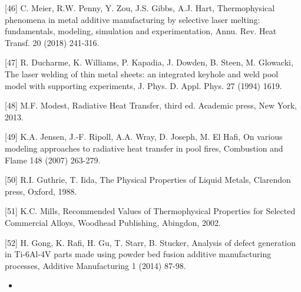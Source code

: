 \documentclass[10pt]{article}
\begin{document}
[46] C. Meier, R.W. Penny, Y. Zou, J.S. Gibbs, A.J. Hart, Thermophysical phenomena in metal additive manufacturing by selective laser melting: fundamentals, modeling, simulation and experimentation, Annu. Rev. Heat Transf. 20 (2018) 241-316.

[47] R. Ducharme, K. Williams, P. Kapadia, J. Dowden, B. Steen, M. Glowacki, The laser welding of thin metal sheets: an integrated keyhole and weld pool model with supporting experiments, J. Phys. D. Appl. Phys. 27 (1994) 1619.

[48] M.F. Modest, Radiative Heat Transfer, third ed. Academic press, New York, 2013.

[49] K.A. Jensen, J.-F. Ripoll, A.A. Wray, D. Joseph, M. El Hafi, On various modeling approaches to radiative heat transfer in pool fires, Combustion and Flame 148 (2007) 263-279.

[50] R.I. Guthrie, T. Iida, The Physical Properties of Liquid Metals, Clarendon press, Oxford, 1988.

[51] K.C. Mills, Recommended Values of Thermophysical Properties for Selected Commercial Alloys, Woodhead Publishing, Abingdon, 2002.

[52] H. Gong, K. Rafi, H. Gu, T. Starr, B. Stucker, Analysis of defect generation in Ti-6Al-4V parts made using powder bed fusion additive manufacturing processes, Additive Manufacturing 1 (2014) 87-98.

\begin{itemize}
  \item 
\end{itemize}
\end{document}
